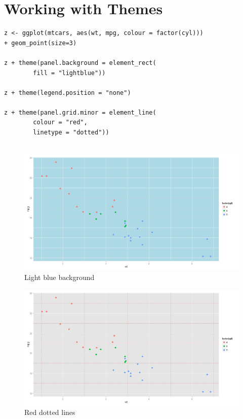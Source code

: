 \documentclass[]{article}
\begin{document}
\section{Working with Themes}
\begin{framed}
\begin{verbatim}
z <- ggplot(mtcars, aes(wt, mpg, colour = factor(cyl))) 
+ geom_point(size=3) 

z + theme(panel.background = element_rect(
        fill = "lightblue"))

z + theme(legend.position = "none")

z + theme(panel.grid.minor = element_line(
      	colour = "red", 
      	linetype = "dotted"))


\end{verbatim}
\end{framed}
\newpage
\begin{figure}[h!]
\centering
\includegraphics[width=1.10\linewidth]{./lightblue_bg}
\caption{Light blue background}
\label{fig:lightblue_bg}
\end{figure}

\begin{figure}[h!]
\centering
\includegraphics[width=1.10\linewidth]{./reddotline_bg}
\caption{Red dotted lines}
\label{fig:reddotline_bg}
\end{figure}
\end{document}
